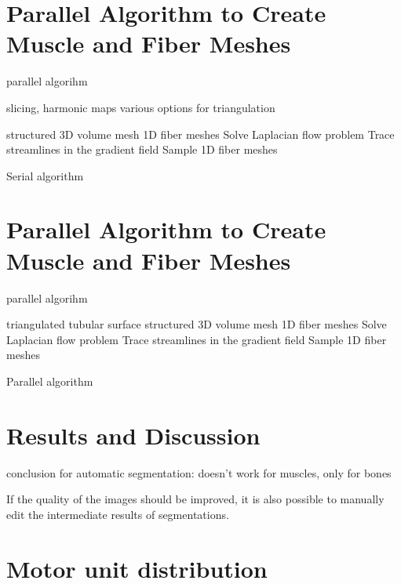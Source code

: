 \section{Parallel Algorithm to Create Muscle and Fiber Meshes}\label{sec:parallel_algorithm}
parallel algorihm

slicing, harmonic maps
various options for triangulation


\begin{algorithm}
  \begin{algorithmic}[1]%
    \Statex{}
    \Require structured 3D volume mesh
    \Ensure 1D fiber meshes
    \Statex
    \State Solve Laplacian flow problem
    \State Trace streamlines in the gradient field
    \State Sample 1D fiber meshes
    \EndProcedure
  \end{algorithmic}%
  \caption{Serial algorithm}%
  \label{alg:serial_algorithm_2}%
\end{algorithm}%

\section{Parallel Algorithm to Create Muscle and Fiber Meshes}\label{sec:parallel_algorithm}
parallel algorihm



\begin{algorithm}
  \begin{algorithmic}[1]%
    \Require triangulated tubular surface
    \Ensure structured 3D volume mesh
    \Ensure 1D fiber meshes
    \Statex
    \State Solve Laplacian flow problem
    \State Trace streamlines in the gradient field
    \State Sample 1D fiber meshes
    \EndProcedure
  \end{algorithmic}%
  \caption{Parallel algorithm}%
  \label{alg:parallel_algorithm_1}%
\end{algorithm}%


\section{Results and Discussion}

conclusion for automatic segmentation: doesn't work for muscles, only for bones

If the quality of the images should be improved, it is also possible to manually edit the intermediate results of segmentations.

\section{Motor unit distribution}


